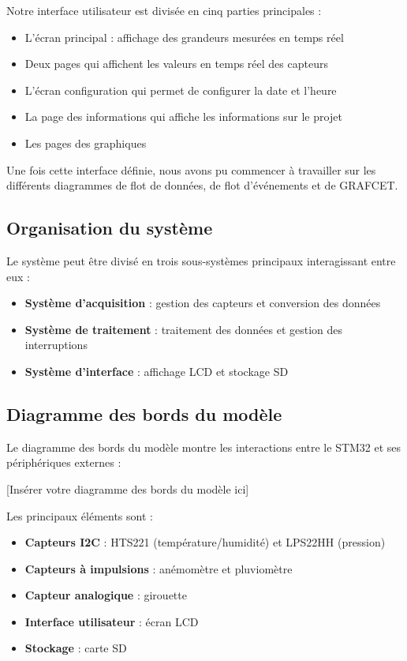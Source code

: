 \documentclass[12pt]{article}
\begin{document}
Notre interface utilisateur est divisée en cinq parties principales :
\begin{itemize}
    \item L'écran principal : affichage des grandeurs mesurées en temps réel
    \item Deux pages qui affichent les valeurs en temps réel des capteurs
    \item L'écran configuration qui permet de configurer la date et l'heure
    \item La page des informations qui affiche les informations sur le projet
    \item Les pages des graphiques
\end{itemize}

Une fois cette interface définie, nous avons pu commencer à travailler sur les différents diagrammes de flot de données, de flot d'événements et de GRAFCET.
\subsection{Organisation du système}
Le système peut être divisé en trois sous-systèmes principaux interagissant entre eux :
\begin{itemize}
    \item \textbf{Système d'acquisition} : gestion des capteurs et conversion des données
    \item \textbf{Système de traitement} : traitement des données et gestion des interruptions
    \item \textbf{Système d'interface} : affichage LCD et stockage SD
\end{itemize}

\subsection{Diagramme des bords du modèle}
Le diagramme des bords du modèle montre les interactions entre le STM32 et ses périphériques externes :

[Insérer votre diagramme des bords du modèle ici]

Les principaux éléments sont :
\begin{itemize}
    \item \textbf{Capteurs I2C} : HTS221 (température/humidité) et LPS22HH (pression)
    \item \textbf{Capteurs à impulsions} : anémomètre et pluviomètre
    \item \textbf{Capteur analogique} : girouette
    \item \textbf{Interface utilisateur} : écran LCD
    \item \textbf{Stockage} : carte SD
\end{itemize}
\end{document}
